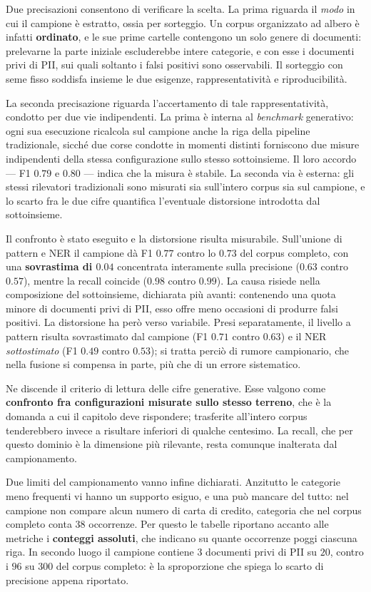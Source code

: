 Due precisazioni consentono di verificare la scelta. La prima riguarda il \emph{modo} in cui il campione è estratto, ossia per sorteggio. Un corpus organizzato ad albero è infatti \textbf{ordinato}, e le sue prime cartelle contengono un solo genere di documenti: prelevarne la parte iniziale escluderebbe intere categorie, e con esse i documenti privi di PII, sui quali soltanto i falsi positivi sono osservabili. Il sorteggio con seme fisso soddisfa insieme le due esigenze, rappresentatività e riproducibilità.

La seconda precisazione riguarda l'accertamento di tale rappresentatività, condotto per due vie indipendenti. La prima è interna al \textit{benchmark} generativo: ogni sua esecuzione ricalcola sul campione anche la riga della pipeline tradizionale, sicché due corse condotte in momenti distinti forniscono due misure indipendenti della stessa configurazione sullo stesso sottoinsieme. Il loro accordo --- F1 $0.79$ e $0.80$ --- indica che la misura è stabile. La seconda via è esterna: gli stessi rilevatori tradizionali sono misurati sia sull'intero corpus sia sul campione, e lo scarto fra le due cifre quantifica l'eventuale distorsione introdotta dal sottoinsieme.

Il confronto è stato eseguito e la distorsione risulta misurabile. Sull'unione di pattern e NER il campione dà F1 $0.77$ contro lo $0.73$ del corpus completo, con una \textbf{sovrastima di $0.04$} concentrata interamente sulla precisione ($0.63$ contro $0.57$), mentre la recall coincide ($0.98$ contro $0.99$). La causa risiede nella composizione del sottoinsieme, dichiarata più avanti: contenendo una quota minore di documenti privi di PII, esso offre meno occasioni di produrre falsi positivi. La distorsione ha però verso variabile. Presi separatamente, il livello a pattern risulta sovrastimato dal campione (F1 $0.71$ contro $0.63$) e il NER \emph{sottostimato} (F1 $0.49$ contro $0.53$); si tratta perciò di rumore campionario, che nella fusione si compensa in parte, più che di un errore sistematico.

Ne discende il criterio di lettura delle cifre generative. Esse valgono come \textbf{confronto fra configurazioni misurate sullo stesso terreno}, che è la domanda a cui il capitolo deve rispondere; trasferite all'intero corpus tenderebbero invece a risultare inferiori di qualche centesimo. La recall, che per questo dominio è la dimensione più rilevante, resta comunque inalterata dal campionamento.

Due limiti del campionamento vanno infine dichiarati. Anzitutto le categorie meno frequenti vi hanno un supporto esiguo, e una può mancare del tutto: nel campione non compare alcun numero di carta di credito, categoria che nel corpus completo conta $38$ occorrenze. Per questo le tabelle riportano accanto alle metriche i \textbf{conteggi assoluti}, che indicano su quante occorrenze poggi ciascuna riga. In secondo luogo il campione contiene $3$ documenti privi di PII su $20$, contro i $96$ su $300$ del corpus completo: è la sproporzione che spiega lo scarto di precisione appena riportato.

